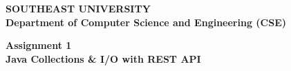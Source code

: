 \documentclass[12pt, a4paper]{article}
\begin{document}
    \begin{titlepage}                                                                                                                                                      
        \begin{center}                                                                                                                                                     
            \vspace*{1cm}                                                                                                                                                  
                                                                                                                                                                           
            \Large{\textbf{SOUTHEAST UNIVERSITY}}\\                                                                                                                        
            \large{\textbf{Department of Computer Science and Engineering (CSE)}}                                                                                          
                                                                                                                                                                           
            \vspace{1.5cm}                                                                                                                                                 
                                                                                                                                                                           
            \Large{\textbf{Assignment 1}}\\                                                                                                                                
            \large{\textbf{Java Collections \& I/O with REST API}}                                                                                                         
                                                                                                                                                                           
            \vspace{1.5cm}                                                                                                                                                 
                                                                                                                                                                           

\end{center}
\end{titlepage}
\end{document}
